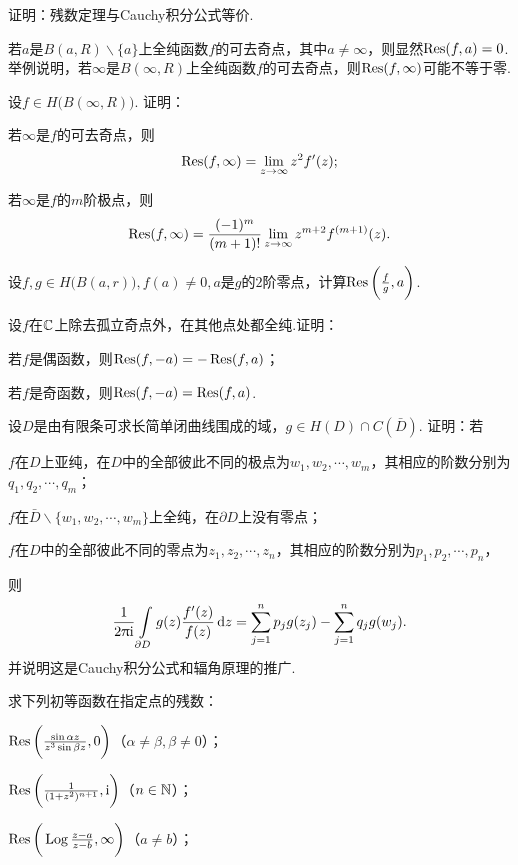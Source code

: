 \begin{xiti}
\item 证明：残数定理与Cauchy积分公式等价.
\item 若$a$是$B(a,R)\backslash\{a\}$上全纯函数$f$的可去奇点，其中$a\ne\infty$，则显然$\operatorname*{Res}(f,a)=0$.举例说明，若$\infty$是$B(\infty,R)$上全纯函数$f$的可去奇点，则$\operatorname*{Res}(f,\infty)$可能不等于零.
\item 设$f\in H\big(B(\infty,R)\big)$. 证明：
\begin{enuma}
  \item 若$\infty$是$f$的可去奇点，则
  \[\operatorname*{Res}(f,\infty)=\lim_{z\to\infty}z^2f'(z);\]
  \item 若$\infty$是$f$的$m$阶极点，则
  \[\operatorname*{Res}(f,\infty)=\frac{(-1)^m}{(m+1)!}\lim_{z\to\infty}z^{m+2}f^{(m+1)}(z).\]
\end{enuma}
\item 设$f,g\in H\big(B(a,r)\big),f(a)\ne0,a$是$g$的$2$阶零点，计算$\operatorname*{Res}\bigg(\frac fg,a\bigg)$.
\item 设$f$在$\mathbb C$上除去孤立奇点外，在其他点处都全纯.证明：
\begin{enuma}
  \item 若$f$是偶函数，则$\operatorname*{Res}(f,-a)=-\operatorname*{Res}(f,a)$；
  \item 若$f$是奇函数，则$\operatorname*{Res}(f,-a)=\operatorname*{Res}(f,a)$.
\end{enuma}
\item 设$D$是由有限条可求长简单闭曲线围成的域，$g\in H(D)\cap C(\bar D)$. 证明：若
\begin{enuma}
  \item $f$在$D$上亚纯，在$D$中的全部彼此不同的极点为$w_1,w_2,\cdots,w_m$，其相应的阶数分别为
  $q_1,q_2,\cdots,q_m$；
  \item $f$在$\bar D\backslash\{w_1,w_2,\cdots,w_m\}$上全纯，在$\partial D$上没有零点；
  \item $f$在$D$中的全部彼此不同的零点为$z_1,z_2,\cdots,z_n$，其相应的阶数分别为$p_1,p_2,\cdots,p_n$，
\end{enuma}
则
\[\frac1{2\uppi\mathrm i}\int\limits_{\partial D}g(z)\frac{f'(z)}{f(z)}\mathop{}\!\mathrm dz=\sum_{j=1}^n
p_jg(z_j)-\sum_{j=1}^n q_jg(w_j).\]
并说明这是Cauchy积分公式和辐角原理的推广.
\item 求下列初等函数在指定点的残数：
\begin{enuma}
  \item $\operatorname*{Res}\bigg(\frac{\sin\alpha z}{z^3\sin\beta z},0\bigg)$（$\alpha\ne\beta,\beta\ne0$）；
  \item $\operatorname*{Res}\bigg(\frac1{(1+z^2)^{n+1}},\mathrm i\bigg)$（$n\in\mathbb N$）；
  \item $\operatorname*{Res}\bigg(\operatorname{Log}\frac{z-a}{z-b},\infty\bigg)$（$a\ne b$）；

\end{enuma}
\end{xiti}
